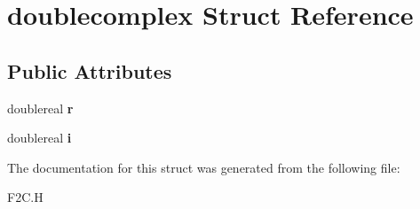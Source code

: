 \hypertarget{structdoublecomplex}{\section{doublecomplex Struct Reference}
\label{structdoublecomplex}
}
\subsection*{Public Attributes}
\begin{DoxyCompactItemize}
\item 
\hypertarget{structdoublecomplex_aa21d9095ea8af6f0530961e14e25d060}{doublereal {\bfseries r}}\label{structdoublecomplex_aa21d9095ea8af6f0530961e14e25d060}

\item 
\hypertarget{structdoublecomplex_a29ac0f1fc7a96e2344ef1464a80e2877}{doublereal {\bfseries i}}\label{structdoublecomplex_a29ac0f1fc7a96e2344ef1464a80e2877}

\end{DoxyCompactItemize}


The documentation for this struct was generated from the following file\+:\begin{DoxyCompactItemize}
\item 
F2\+C.\+H\end{DoxyCompactItemize}
